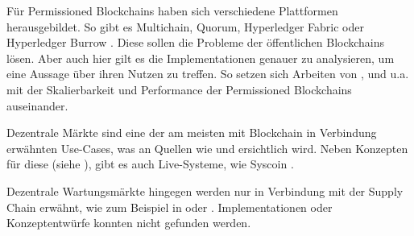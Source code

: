 Für Permissioned Blockchains haben sich verschiedene Plattformen herausgebildet. So gibt es Multichain, Quorum, Hyperledger Fabric oder Hyperledger Burrow \cite{BenHamidaBlockchainEnterpriseOverview2017}. Diese sollen die Probleme der öffentlichen Blockchains lösen. Aber auch hier gilt es die Implementationen genauer zu analysieren, um eine Aussage über ihren Nutzen zu treffen. So setzen sich Arbeiten von \cite{BenHamidaBlockchainEnterpriseOverview2017}\cite{LiScalablePrivateIndustrial2017}, \cite{PongnumkulPerformanceAnalysisPrivate2017} und \cite{VukolicRethinkingPermissionedBlockchains2017} u.a. mit der Skalierbarkeit und Performance der Permissioned Blockchains auseinander.

Dezentrale Märkte sind eine der am meisten mit Blockchain in Verbindung erwähnten Use-Cases, was an Quellen wie \cite{BenHamidaBlockchainEnterpriseOverview2017} und \cite[S.~33 ff.]{RavalDecentralizedApplicationsHarnessing2016} ersichtlich wird.
Neben Konzepten für diese (siehe \cite{KaiserDecentralizedPrivateMarketplace2017}), gibt es auch Live-Systeme, wie Syscoin \cite{SidhuSyscoinPeertoPeerElectronic2017}.

Dezentrale Wartungsmärkte hingegen werden nur in Verbindung mit der Supply Chain erwähnt, wie zum Beispiel in \cite{SoldatosWhatDoesBlockchain2017} oder \cite{GotzeLufthansaIndustrySolutions}. Implementationen oder Konzeptentwürfe konnten nicht gefunden werden.
